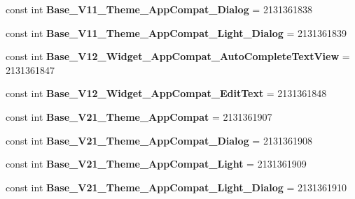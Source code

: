 \begin{DoxyCompactItemize}
\item 
\mbox{\label{classXaria_1_1Resource_1_1Style_a67fec66da138c65c716e9815fedb4bb4}} 
const int {\bfseries Base\+\_\+\+V11\+\_\+\+Theme\+\_\+\+App\+Compat\+\_\+\+Dialog} = 2131361838
\item 
\mbox{\label{classXaria_1_1Resource_1_1Style_a06f98550e1b302aef0efc4f0e2fdd368}} 
const int {\bfseries Base\+\_\+\+V11\+\_\+\+Theme\+\_\+\+App\+Compat\+\_\+\+Light\+\_\+\+Dialog} = 2131361839
\item 
\mbox{\label{classXaria_1_1Resource_1_1Style_ab8e491b395bbd30fbb08f887eb808e2e}} 
const int {\bfseries Base\+\_\+\+V12\+\_\+\+Widget\+\_\+\+App\+Compat\+\_\+\+Auto\+Complete\+Text\+View} = 2131361847
\item 
\mbox{\label{classXaria_1_1Resource_1_1Style_a04ae8572b11feaad23bf7896e9554c37}} 
const int {\bfseries Base\+\_\+\+V12\+\_\+\+Widget\+\_\+\+App\+Compat\+\_\+\+Edit\+Text} = 2131361848
\item 
\mbox{\label{classXaria_1_1Resource_1_1Style_ae7c348d20cfa02c358535a775143cf6e}} 
const int {\bfseries Base\+\_\+\+V21\+\_\+\+Theme\+\_\+\+App\+Compat} = 2131361907
\item 
\mbox{\label{classXaria_1_1Resource_1_1Style_ac51a8701b6003b65527b0bf31f6256b7}} 
const int {\bfseries Base\+\_\+\+V21\+\_\+\+Theme\+\_\+\+App\+Compat\+\_\+\+Dialog} = 2131361908
\item 
\mbox{\label{classXaria_1_1Resource_1_1Style_a56e0b948e98beb0d69a7c420988fd96b}} 
const int {\bfseries Base\+\_\+\+V21\+\_\+\+Theme\+\_\+\+App\+Compat\+\_\+\+Light} = 2131361909
\item 
\mbox{\label{classXaria_1_1Resource_1_1Style_a0a2a71258686c2f136d332a96be0523d}} 
const int {\bfseries Base\+\_\+\+V21\+\_\+\+Theme\+\_\+\+App\+Compat\+\_\+\+Light\+\_\+\+Dialog} = 2131361910
\item 
\mbox{\label{classXaria_1_1Resource_1_1Style_ab0d070f6445b4105dc96303bb51f8f01}} 

\end{DoxyCompactItemize}

